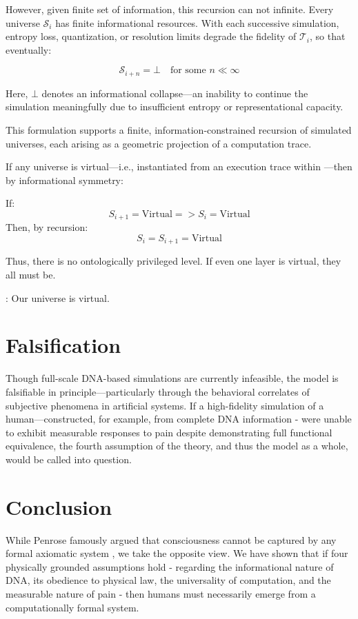 \documentclass[11pt]{article}
\begin{document}
However, given finite set of information, this recursion can not infinite. Every universe \( \mathcal{S}_i \) has finite informational resources. With each successive simulation, entropy loss, quantization, or resolution limits degrade the fidelity of \( \mathcal{T}_i \), so that eventually:

\[
  \mathcal{S}_{i+n} = \bot \quad \text{for some } n \ll \infty
\]

Here, \( \bot \) denotes an informational collapse—an inability to continue the simulation meaningfully due to insufficient entropy or representational capacity.

This formulation supports a finite, information-constrained recursion of simulated universes, each arising as a geometric projection of a computation trace.

If any universe  is virtual—i.e., instantiated from an execution trace within —then by informational symmetry:

If:
\[
  S_{i+1} = \text{Virtual} => S_{i} = \text{Virtual}
\]
Then, by recursion:
\[
  S_i = S_{i+1} = \text{Virtual}
\]

Thus, there is no ontologically privileged level. If even one layer is virtual, they all must be.

: Our universe is virtual.



\section{Falsification}

Though full-scale DNA-based simulations are currently infeasible, the model is falsifiable in principle—particularly through the behavioral correlates of subjective phenomena in artificial systems. If a high-fidelity simulation of a human—constructed, for example,
from complete DNA information - were unable to exhibit measurable responses to pain despite demonstrating full functional
equivalence, the fourth assumption of the theory, and thus the model as a whole, would be called into question.



\section{Conclusion}

While Penrose \cite{penrose1989emperor} famously argued that consciousness cannot be captured by any formal axiomatic system , we take the opposite view. We have shown that if four physically grounded assumptions hold - regarding the informational nature of DNA, its obedience to physical law, the universality of computation, and the measurable nature of pain - then humans must necessarily emerge from a computationally formal system.
\end{document}

